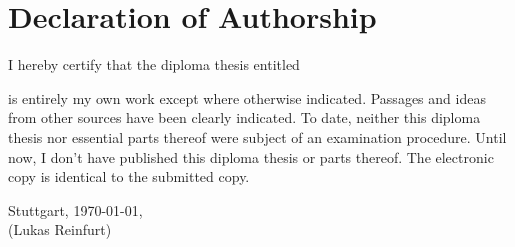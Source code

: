 \chapter*{Declaration of Authorship}

\noindent
I hereby certify that the diploma thesis entitled

\vspace{1em}

\textit{\thesistitle}

\vspace{1em}

\noindent
is entirely my own work except where otherwise indicated. Passages and ideas from other sources have been clearly indicated.
To date, neither this diploma thesis nor essential parts thereof were subject of an examination procedure.
Until now, I don't have published this diploma thesis or parts thereof.
The electronic copy is identical to the submitted copy.

\vspace{4em}

\noindent
Stuttgart, \today,\hspace{4em}\hdashrule[0.5ex][x]{9cm}{1pt}{1pt}\\
\phantom{Stuttgart, \today,}\hspace{4em}(Lukas Reinfurt)
